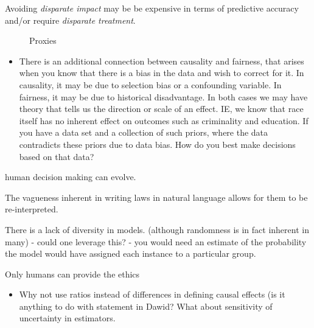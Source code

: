 Avoiding \textit{disparate impact} may be be expensive in terms of predictive accuracy and/or require \textit{disparate treatment}. 

\begin{figure}[H]
\caption{Proxies}
\label{fig:recidivism}
	\centering    
\end{figure}


\begin{itemize}
\item There is an additional connection between causality and fairness, that arises when you know that there is a bias in the data and wish to correct for it. In causality, it may be due to selection bias or a confounding variable. In fairness, it may be due to historical disadvantage. In both cases we may have theory that tells us the direction or scale of an effect. IE, we know that race itself has no inherent effect on outcomes such as criminality and education. If you have a data set and a collection of such priors, where the data contradicts these priors due to data bias. How do you best make decisions based on that data? 
\end{itemize}


human decision making can evolve. 

The vagueness inherent in writing laws in natural language allows for them to be re-interpreted. 

There is a lack of diversity in models. (although randomness is in fact inherent in many) - could one leverage this? - you would need an estimate of the probability the model would have assigned each instance to a particular group. 

Only humans can provide the ethics

\begin{itemize}
\item Why not use ratios instead of differences in defining causal effects (is it anything to do with statement in Dawid? What about sensitivity of uncertainty in estimators.
\end{itemize}


